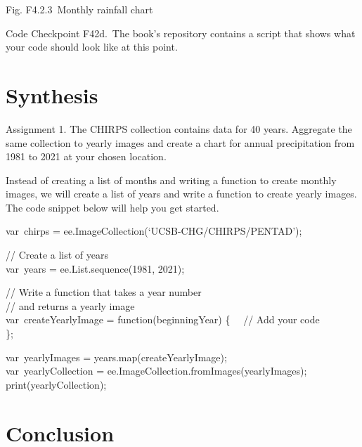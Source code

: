 \documentclass[
  letterpaper,
  DIV=11,
  numbers=noendperiod]{scrreprt}
\begin{document}
Fig. F4.2.3~Monthly rainfall chart

\begin{tcolorbox}[enhanced jigsaw, left=2mm, breakable, rightrule=.15mm, opacityback=0, colframe=quarto-callout-note-color-frame, colbacktitle=quarto-callout-note-color!10!white, arc=.35mm, opacitybacktitle=0.6, toptitle=1mm, colback=white, leftrule=.75mm, title=\textcolor{quarto-callout-note-color}{\faInfo}\hspace{0.5em}{Note}, toprule=.15mm, bottomtitle=1mm, titlerule=0mm, bottomrule=.15mm, coltitle=black]

Code Checkpoint F42d.~The book's repository contains a script that shows
what your code should look like at this point.

\end{tcolorbox}

\hypertarget{synthesis-5}{%
\section*{Synthesis}\label{synthesis-5}}


Assignment 1. The CHIRPS collection contains data for 40 years.
Aggregate the same collection to yearly images and create a chart for
annual precipitation from 1981 to 2021 at your chosen location.

Instead of creating a list of months and writing a function to create
monthly images, we will create a list of years and write a function to
create yearly images. The code snippet below will help you get started.

var~chirps = ee.ImageCollection(`UCSB-CHG/CHIRPS/PENTAD');

// Create a list of years\\
var~years = ee.List.sequence(1981, 2021);

// Write a function that takes a year number\\
// and returns a yearly image\\
var~createYearlyImage = function(beginningYear) \{~ ~// Add your code\\
\};

var~yearlyImages = years.map(createYearlyImage);\\
var~yearlyCollection = ee.ImageCollection.fromImages(yearlyImages);\\
print(yearlyCollection);

\hypertarget{conclusion-9}{%
\section*{Conclusion}\label{conclusion-9}}
\end{document}
